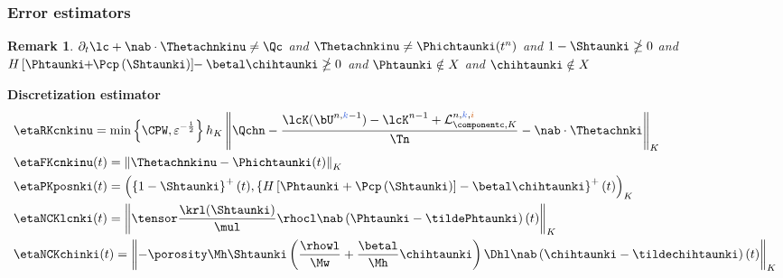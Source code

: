 \documentclass[10 pt]{beamer}
\newtheorem{remark}[theorem]{Remark}
\begin{document}
\begin{frame}
\frametitle{Error estimators}
\begin{remark}
$\partial_t \lc + \nab \cdot \Thetachnkinu \neq \Qc$ and $\Thetachnkinu \neq \Phichtaunki(t^n)$ and $1 - \Shtaunki \ngeq 0$ and $H\left[\Phtaunki \hspace{-0.1 cm}+\hspace{-0.1 cm} \Pcp\left(\Shtaunki\right)\right]\hspace{-0.1 cm}-\betal \chihtaunki \ngeq 0$ and $\Phtaunki \notin X$ and $\chihtaunki \notin X$
\end{remark}
\textcolor{cadmiumgreen}{\textbf{Discretization estimator}}
\begin{equation*}
\begin{split}
&\etaRKcnkinu = \min\left\{\CPW,\varepsilon^{-\frac{1}{2}}\right\} h_K \left\|\Qchn - \frac{\lcK(\bU^{n,\kk-1}) - \lcK^{n-1} + \mathcal{L}_{\componentc,K}^{n,\kk,\ii}}{\Tn} - \nab \cdot \Thetachnki \right\|_K \\
&\etaFKcnkinu(t) = \left\|\Thetachnkinu - \Phichtaunki(t) \right\|_K\\
&\etaPKposnki(t) =\left(\left\{1-\Shtaunki\right\}^{+}(t),\left\{H\left[\Phtaunki + \Pcp\left(\Shtaunki\right)\right]-\betal \chihtaunki\right\}^{+}(t)\right)_K\\
&\etaNCKlcnki(t) = \left\| \tensor \frac{\krl(\Shtaunki)}{\mul} \rhocl \nab \left(\Phtaunki-\tildePhtaunki  \right)(t) \right\|_K\\
&\etaNCKchinki(t)  = \left\| -\porosity \Mh \Shtaunki \left(\frac{\rhowl}{\Mw} + \frac{\betal}{\Mh}\chihtaunki \right) \Dhl \nab \left(\chihtaunki-\tildechihtaunki \right)(t) \right\|_K
\end{split}
\end{equation*}
\end{frame}
%
\end{document}
